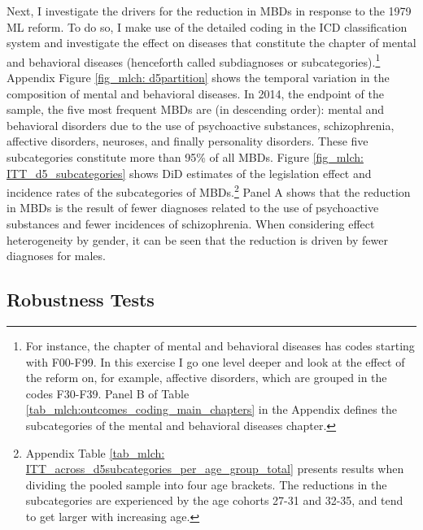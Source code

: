 Next, I investigate the drivers for the reduction in MBDs in response to the 1979 ML reform. To do so, I make use of the detailed coding in the ICD classification system and investigate the effect on diseases that constitute the chapter of mental and behavioral diseases (henceforth called subdiagnoses or subcategories).\footnote{For instance, the chapter of mental and behavioral diseases has codes starting with F00-F99. In this exercise I go one level deeper and look at the effect of the reform on, for example, affective disorders, which are grouped in the codes F30-F39. Panel B of Table \ref{tab_mlch:outcomes_coding_main_chapters} in the Appendix defines the subcategories of the mental and behavioral diseases chapter.} Appendix Figure \ref{fig_mlch: d5partition} shows the temporal variation in the composition of mental and behavioral diseases. In 2014, the endpoint of the sample, the five most frequent MBDs are (in descending order): mental and behavioral disorders due to the use of psychoactive substances, schizophrenia, affective disorders, neuroses, and finally personality disorders. These five subcategories constitute more than 95\% of all MBDs. Figure \ref{fig_mlch: ITT_d5_subcategories} shows DiD estimates of the legislation effect and incidence rates of the subcategories of MBDs.\footnote{Appendix Table \ref{tab_mlch: ITT_across_d5subcategories_per_age_group_total} presents results when dividing the pooled sample into four age brackets. The reductions in the subcategories are experienced by the age cohorts 27-31 and 32-35, and tend to get larger with increasing age.} %
Panel A shows that the reduction in MBDs is the result of fewer diagnoses related to the use of psychoactive substances and fewer incidences of schizophrenia. When considering effect heterogeneity by gender, it can be seen that the reduction is driven by fewer diagnoses for males. 








\bigskip
\subsection{Robustness Tests}\label{sec_mlch: robustness}

